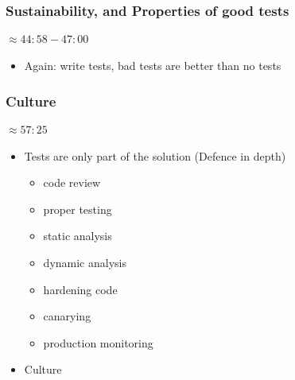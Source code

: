 \begin{frame}[fragile,t]
\frametitle{Sustainability, and Properties of good tests}
\framesubtitle{$\approx 44:58 - 47:00$}


\begin{itemize}
\item Again: write tests, bad tests are better than no tests
\end{itemize}


\end{frame}

\begin{frame}[fragile,t]
\frametitle{Culture}
\framesubtitle{$\approx 57:25$}
\begin{itemize}
\item Tests are only part of the solution (Defence in depth)
\begin{itemize}
\item code review
\item proper testing
\item static analysis
\item dynamic analysis
\item hardening code
\item canarying
\item production monitoring
\end{itemize}

\item Culture
\end{itemize}


\end{frame}

